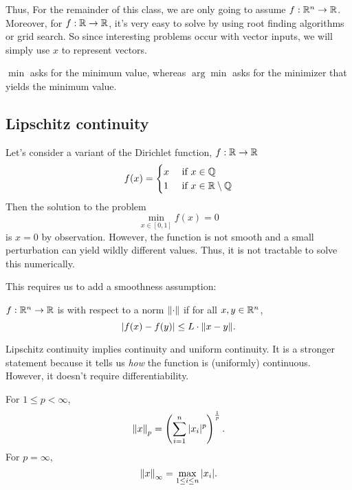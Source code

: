 \documentclass[class=article,crop=false]{standalone}
\begin{document}
Thus, For the remainder of this class, we are only going to assume $ f: \mathbb{R}^n \to \mathbb{R}$. 
\\

Moreover, for $ f: \mathbb{R} \to \mathbb{R}$, it's very easy to solve by using root finding algorithms or grid search. So since interesting problems occur with vector inputs, we will simply use $ x$ to represent vectors.

\begin{notation}
	$ \min$ asks for the minimum value, whereas $ \arg\min$ asks for the minimizer that yields the minimum value.
\end{notation}
\newpage
\subsection{Lipschitz continuity}
\begin{eg}
Let's consider a variant of the Dirichlet function, $ f: \mathbb{R} \to \mathbb{R}$
\begin{equation*}
	f(x)=
\begin{cases}
	x & \text{ if } x \in \mathbb{Q}\\  
	1 & \text{ if } x \in \mathbb{R} \setminus \mathbb{Q} 
\end{cases}
\end{equation*}
Then the solution to the problem
\[
	\min_{x \in [0,1]} f(x) = 0
\] 
is $ x=0$ by observation. However, the function is not smooth and a small perturbation can yield wildly different values. Thus, it is not tractable to solve this numerically.
\end{eg}

This requires us to add a smoothness assumption:
\begin{defn}
	$ f: \mathbb{R}^{n} \to \mathbb{R}$ is  with respect to a norm $ {\left\lVert{ \cdot }\right\rVert} $ if for all $ x, y \in \mathbb{R}^{n}$,
\[
	|f(x) - f(y)|\leq L \cdot {\left\lVert{x-y}\right\rVert} 
.\]
\end{defn}

\begin{note}
	Lipschitz continuity implies continuity and uniform continuity. It is a stronger statement because it tells us \emph{how} the function is (uniformly) continuous. However, it doesn't require differentiability. 
\end{note}

\begin{defn}
For $ 1\leq p < \infty$,
 \[
	 {\left\lVert{x}\right\rVert}_p = \left( \sum_{ i= 1}^{ n} |x_i|^p \right)^{\frac{1}{p}}  
.\] 
For $ p = \infty$,
\[
{\left\lVert{x}\right\rVert}_{\infty} = \max_{1\leq i\leq n} |x_i|
.\]
\end{defn}
\end{document}
